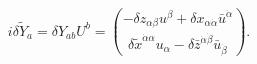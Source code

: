 \begin{equation}\label{34}
i\delta\tilde Y_a=\delta Y_{ab}U^b ={-\delta z_{\alpha\beta}u^\beta+\delta 
x_{\alpha\dot\alpha}\bar u^{\dot\alpha}\choose\delta\tilde 
x^{\dot\alpha\alpha}u_\alpha-\delta\bar z^{\dot\alpha\dot\beta}\bar 
u_{\dot\beta}}.
\end{equation}

